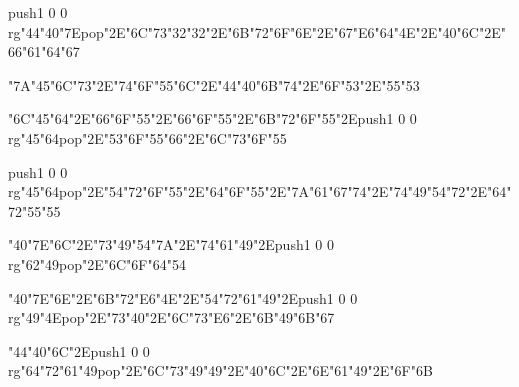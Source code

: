 \centerline{\pdfcolorstack\match push{1 0 0 rg}\ipa\char"44\ipa\char"40\ipa\char"7E\pdfcolorstack\match pop{}\ipa\char"2E\ipa\char"6C\ipa\char"73\ipa\char"32\ipa\char"32\ipa\char"2E\ipa\char"6B\ipa\char"72\ipa\char"6F\ipa\char"6E\ipa\char"2E\ipa\char"67\ipa\char"E6\ipa\char"64\ipa\char"4E\ipa\char"2E\ipa\char"40\ipa\char"6C\ipa\char"2E\ipa\char"66\ipa\char"61\ipa\char"64\ipa\char"67}
\vfill\eject
\null\vfill
\centerline{\ipa\char"7A\ipa\char"45\ipa\char"6C\ipa\char"73\ipa\char"2E\ipa\char"74\ipa\char"6F\ipa\char"55\ipa\char"6C\ipa\char"2E\ipa\char"44\ipa\char"40\ipa\char"6B\ipa\char"74\ipa\char"2E\ipa\char"6F\ipa\char"53\ipa\char"2E\ipa\char"55\ipa\char"53}\bigskip
\centerline{\ipa\char"6C\ipa\char"45\ipa\char"64\ipa\char"2E\ipa\char"66\ipa\char"6F\ipa\char"55\ipa\char"2E\ipa\char"66\ipa\char"6F\ipa\char"55\ipa\char"2E\ipa\char"6B\ipa\char"72\ipa\char"6F\ipa\char"55\ipa\char"2E\pdfcolorstack\match push{1 0 0 rg}\ipa\char"45\ipa\char"64\pdfcolorstack\match pop{}\ipa\char"2E\ipa\char"53\ipa\char"6F\ipa\char"55\ipa\char"66\ipa\char"2E\ipa\char"6C\ipa\char"73\ipa\char"6F\ipa\char"55}\bigskip
\centerline{\pdfcolorstack\match push{1 0 0 rg}\ipa\char"45\ipa\char"64\pdfcolorstack\match pop{}\ipa\char"2E\ipa\char"54\ipa\char"72\ipa\char"6F\ipa\char"55\ipa\char"2E\ipa\char"64\ipa\char"6F\ipa\char"55\ipa\char"2E\ipa\char"7A\ipa\char"61\ipa\char"67\ipa\char"74\ipa\char"2E\ipa\char"74\ipa\char"49\ipa\char"54\ipa\char"72\ipa\char"2E\ipa\char"64\ipa\char"72\ipa\char"55\ipa\char"55}
\vfill\eject
\null\vfill
\centerline{\ipa\char"40\ipa\char"7E\ipa\char"6C\ipa\char"2E\ipa\char"73\ipa\char"49\ipa\char"54\ipa\char"7A\ipa\char"2E\ipa\char"74\ipa\char"61\ipa\char"49\ipa\char"2E\pdfcolorstack\match push{1 0 0 rg}\ipa\char"62\ipa\char"49\pdfcolorstack\match pop{}\ipa\char"2E\ipa\char"6C\ipa\char"6F\ipa\char"64\ipa\char"54}\bigskip
\centerline{\ipa\char"40\ipa\char"7E\ipa\char"6E\ipa\char"2E\ipa\char"6B\ipa\char"72\ipa\char"E6\ipa\char"4E\ipa\char"2E\ipa\char"54\ipa\char"72\ipa\char"61\ipa\char"49\ipa\char"2E\pdfcolorstack\match push{1 0 0 rg}\ipa\char"49\ipa\char"4E\pdfcolorstack\match pop{}\ipa\char"2E\ipa\char"73\ipa\char"40\ipa\char"2E\ipa\char"6C\ipa\char"73\ipa\char"E6\ipa\char"2E\ipa\char"6B\ipa\char"49\ipa\char"6B\ipa\char"67}\bigskip
\centerline{\ipa\char"44\ipa\char"40\ipa\char"6C\ipa\char"2E\pdfcolorstack\match push{1 0 0 rg}\ipa\char"64\ipa\char"72\ipa\char"61\ipa\char"49\pdfcolorstack\match pop{}\ipa\char"2E\ipa\char"6C\ipa\char"73\ipa\char"49\ipa\char"49\ipa\char"2E\ipa\char"40\ipa\char"6C\ipa\char"2E\ipa\char"6E\ipa\char"61\ipa\char"49\ipa\char"2E\ipa\char"6F\ipa\char"6B}
